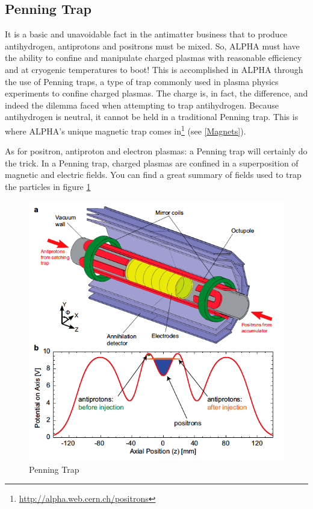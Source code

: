 \documentclass[12pt,a4paper]{article}
\begin{document}
\subsection{Penning Trap}
It is a basic and unavoidable fact in the antimatter business that to produce antihydrogen, antiprotons and positrons must be mixed. So, ALPHA must have the ability to confine and manipulate charged plasmas with reasonable efficiency and at cryogenic temperatures to boot!
This is accomplished in ALPHA through the use of Penning traps, a type of trap commonly used in plasma physics experiments to confine charged plasmas. The charge is, in fact, the difference, and indeed the dilemma faced when attempting to trap antihydrogen. Because antihydrogen is neutral, it cannot be held in a traditional Penning trap. This is where ALPHA’s unique magnetic trap comes in\footnote{\url{http://alpha.web.cern.ch/positrons}} (see \ref{Magnets}).

As for positron, antiproton and electron plasmas: a Penning trap will certainly do the trick. In a Penning trap, charged plasmas are confined in a superposition of magnetic and electric fields. You can find a great summary of fields used to trap the particles in figure \ref{trap}

\begin{figure}[h]
\centering
\includegraphics[scale=0.4]{penning-trap-figure}
\caption{Penning Trap}
\label{trap}
\end{figure}
\end{document}
